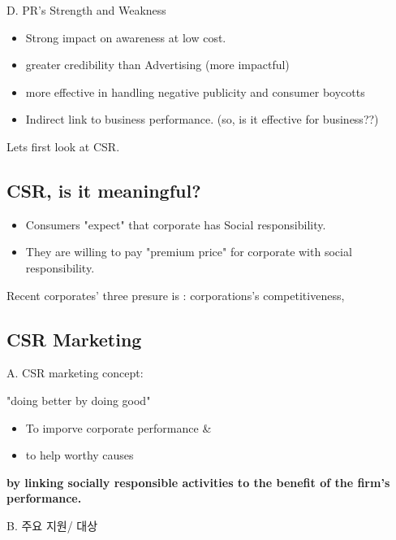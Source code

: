 \documentclass[12pt]{article}
\newcommand{\tb}{\textbf}
\begin{document}
\begin{itemize}
D. PR's Strength and Weakness
\begin{itemize}
	\item Strong impact on awareness at low cost.
	\item greater credibility than Advertising (more impactful)
	\item more effective in handling negative publicity and consumer boycotts

	\item Indirect link to business performance. (so, is it effective for business??)

\end{itemize}

Lets first look at CSR.

\subsection{CSR, is it meaningful?}

\begin{itemize}
	\item Consumers "expect" that corporate has Social responsibility.
	\item They are willing to pay "premium price" for corporate with social responsibility.
\end{itemize}


\begin{tcolorbox}
	Recent corporates' three presure is : corporations's competitiveness,

\end{tcolorbox}

\subsection{CSR Marketing}

A. CSR marketing concept:

\begin{tcolorbox}
	"doing better by doing good"
	\begin{itemize}
		\item To imporve corporate performance &
		\item to help worthy causes
	\end{itemize}

	\tb{by linking socially responsible activities
to the benefit of the firm’s performance.}

\end{tcolorbox}

B. 주요 지원/ 대상


\end{itemize}
\end{document}
